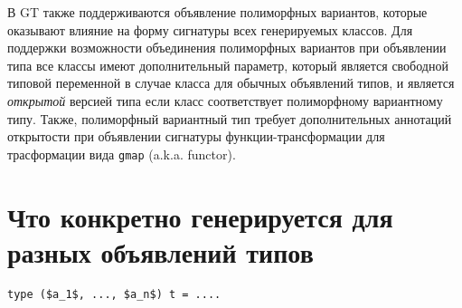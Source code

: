 \documentclass[acmsmall,review,anonymous]{acmart}\settopmatter{printfolios=true,printccs=false,printacmref=false}
\begin{document}
В GT также поддерживаются объявление полиморфных вариантов, которые оказывают влияние на форму сигнатуры всех генерируемых классов.
Для поддержки возможности объединения полиморфных вариантов при объявлении типа все классы имеют дополнительный параметр, который 
является свободной типовой переменной в случае класса для обычных объявлений типов, и является \textit{открытой} версией типа если класс 
соответствует полиморфному вариантному типу. Также, полиморфный вариантный тип требует дополнительных аннотаций открытости при объявлении
сигнатуры функции-трансформации для трасформации вида \verb=gmap= (a.k.a. functor).

\section{Что конкретно генерируется для разных объявлений типов}
\lstinline{type ($a_1$, ..., $a_n$) t = ....}
\end{document}
